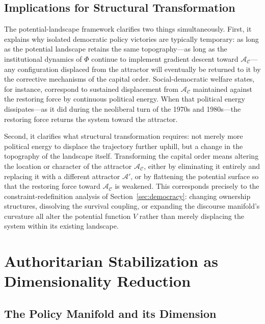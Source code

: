 \documentclass[12pt,a4paper]{article}
\theoremstyle{definition}
\theoremstyle{remark}
\begin{document}
\subsection{Implications for Structural Transformation}

The potential-landscape framework clarifies two things simultaneously. First, it explains why isolated democratic policy victories are typically temporary: as long as the potential landscape retains the same topography---as long as the institutional dynamics of $\Phi$ continue to implement gradient descent toward $\mathcal{A}_\mathcal{C}$---any configuration displaced from the attractor will eventually be returned to it by the corrective mechanisms of the capital order. Social-democratic welfare states, for instance, correspond to sustained displacement from $\mathcal{A}_\mathcal{C}$ maintained against the restoring force by continuous political energy. When that political energy dissipates---as it did during the neoliberal turn of the 1970s and 1980s---the restoring force returns the system toward the attractor.

Second, it clarifies what structural transformation requires: not merely more political energy to displace the trajectory further uphill, but a change in the topography of the landscape itself. Transforming the capital order means altering the location or character of the attractor $\mathcal{A}_\mathcal{C}$, either by eliminating it entirely and replacing it with a different attractor $\mathcal{A}'$, or by flattening the potential surface so that the restoring force toward $\mathcal{A}_\mathcal{C}$ is weakened. This corresponds precisely to the constraint-redefinition analysis of Section~\ref{sec:democracy}: changing ownership structures, dissolving the survival coupling, or expanding the discourse manifold's curvature all alter the potential function $V$ rather than merely displacing the system within its existing landscape.

\section{Authoritarian Stabilization as Dimensionality Reduction}
\label{sec:authoritarianism}

\subsection{The Policy Manifold and its Dimension}
\end{document}
